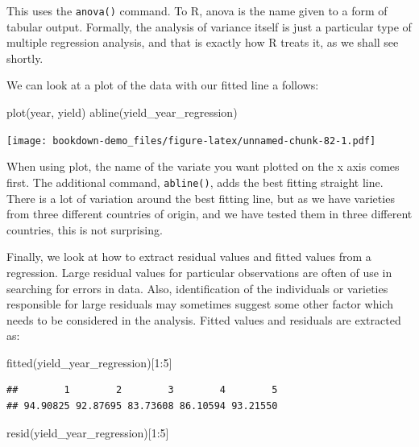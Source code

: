 \documentclass[
]{book}
\newenvironment{Shaded}{\begin{snugshade}}{\end{snugshade}}
\newcommand{\DecValTok}[1]{\textcolor[rgb]{0.00,0.00,0.81}{#1}}
\newcommand{\FunctionTok}[1]{\textcolor[rgb]{0.00,0.00,0.00}{#1}}
\newcommand{\NormalTok}[1]{#1}
\newcommand{\SpecialCharTok}[1]{\textcolor[rgb]{0.00,0.00,0.00}{#1}}
\begin{document}
This uses the \texttt{anova()} command. To R, anova is the name given to a form of tabular output. Formally, the analysis of variance itself is just a particular type of multiple regression analysis, and that is exactly how R treats it, as we shall see shortly.

We can look at a plot of the data with our fitted line a follows:

\begin{Shaded}
\begin{Highlighting}[]
\FunctionTok{plot}\NormalTok{(year, yield)}
\FunctionTok{abline}\NormalTok{(yield\_year\_regression)}
\end{Highlighting}
\end{Shaded}

\texttt{[image: bookdown-demo\_files/figure-latex/unnamed-chunk-82-1.pdf]}

When using plot, the name of the variate you want plotted on the x axis comes first. The additional command, \texttt{abline()}, adds the best fitting straight line. There is a lot of variation around the best fitting line, but as we have varieties from three different countries of origin, and we have tested them in three different countries, this is not surprising.

Finally, we look at how to extract residual values and fitted values from a regression. Large residual values for particular observations are often of use in searching for errors in data. Also, identification of the individuals or varieties responsible for large residuals may sometimes suggest some other factor which needs to be considered in the analysis. Fitted values and residuals are extracted as:

\begin{Shaded}
\begin{Highlighting}[]
\FunctionTok{fitted}\NormalTok{(yield\_year\_regression)[}\DecValTok{1}\SpecialCharTok{:}\DecValTok{5}\NormalTok{]}
\end{Highlighting}
\end{Shaded}

\begin{verbatim}
##        1        2        3        4        5 
## 94.90825 92.87695 83.73608 86.10594 93.21550
\end{verbatim}

\begin{Shaded}
\begin{Highlighting}[]
\FunctionTok{resid}\NormalTok{(yield\_year\_regression)[}\DecValTok{1}\SpecialCharTok{:}\DecValTok{5}\NormalTok{]}
\end{Highlighting}
\end{Shaded}
\end{document}
